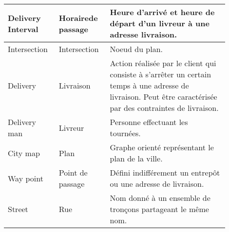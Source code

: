 \begin{longtable}{|p{0.2\linewidth}|p{0.2\linewidth}|p{0.5\linewidth}|}
Delivery Interval                           & Horairede passage              & Heure d'arrivé et heure de départ d'un livreur à une adresse livraison.                                                                                                                                                                                                             \\ \hline
Intersection                                & Intersection                   & Noeud du plan.                                                                                                                                                                                                                                                                      \\ \hline
Delivery                                    & Livraison                      & Action réalisée par le client qui consiste à s'arrêter un certain temps à une adresse de livraison. Peut être caractérisée par des contraintes de livraison.                                                                                                                         \\ \hline
Delivery man                                & Livreur                        & Personne effectuant les tournées.                                                                                                                                                                                                                                                   \\ \hline
City map                                    & Plan                           & Graphe orienté représentant le plan de la ville.                                                                                                                                                                                                                                    \\ \hline
Way point                                   & Point de passage               & Défini indifférement un entrepôt ou une adresse de livraison.                                                                                                                                                                                                                       \\ \hline
Street                                      & Rue                            & Nom donné à un ensemble de tronçons partageant le même nom.                                                                                                                                                                                                                         \\ \hline

\end{longtable}
